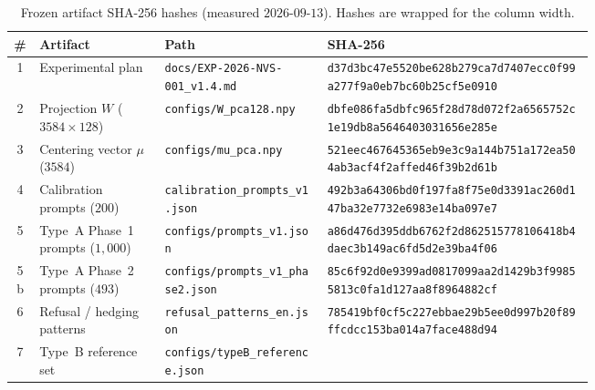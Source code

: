 \documentclass{article}
\begin{document}
\begin{table}[t]
\centering
\caption{Frozen artifact {SHA-256} hashes (measured $2026$-$09$-$13$). Hashes are wrapped for the column width.}
\label{tab:hashes}
\scriptsize
\setlength{\tabcolsep}{3pt}
\begin{tabular}{@{}clp{0.28\linewidth}p{0.46\linewidth}@{}}
\toprule
\# & Artifact & Path & {SHA-256} \\
\midrule
1 & Experimental plan & \texttt{docs/EXP-2026-NVS-001\_v1.4.md} &
\texttt{\linebreak[0]d37d3bc47e5520be628b279c}\linebreak\texttt{a7d7407ecc0f99a277f9a0eb7bc60b25cf5e0910} \\
2 & Projection $W$ ($3584\times128$) & \texttt{configs/W\_pca128.npy} &
\texttt{\linebreak[0]dbfe086fa5dbfc965f28d78d}\linebreak\texttt{072f2a6565752c1e19db8a5646403031656e285e} \\
3 & Centering vector $\mu$ ($3584$) & \texttt{configs/mu\_pca.npy} &
\texttt{\linebreak[0]521eec467645365eb9e3c9a1}\linebreak\texttt{44b751a172ea504ab3acf4f2affed46f39b2d61b} \\
4 & Calibration prompts ($200$) & \texttt{calibration\_prompts\_v1.json} &
\texttt{\linebreak[0]492b3a64306bd0f197fa8f75}\linebreak\texttt{e0d3391ac260d147ba32e7732e6983e14ba097e7} \\
5 & Type~A Phase~1 prompts ($1{,}000$) & \texttt{configs/prompts\_v1.json} &
\texttt{\linebreak[0]a86d476d395ddb6762f2d862}\linebreak\texttt{515778106418b4daec3b149ac6fd5d2e39ba4f06} \\
5b & Type~A Phase~2 prompts ($493$) & \texttt{configs/prompts\_v1\_phase2.json} &
\texttt{\linebreak[0]85c6f92d0e9399ad0817099a}\linebreak\texttt{a2d1429b3f99855813c0fa1d127aa8f8964882cf} \\
6 & Refusal / hedging patterns & \texttt{refusal\_patterns\_en.json} &
\texttt{\linebreak[0]785419bf0cf5c227ebbae29b}\linebreak\texttt{5ee0d997b20f89ffcdcc153ba014a7face488d94} \\
7 & Type~B reference set & \texttt{configs/typeB\_reference.json} &

\end{tabular}
\end{table}
\end{document}
